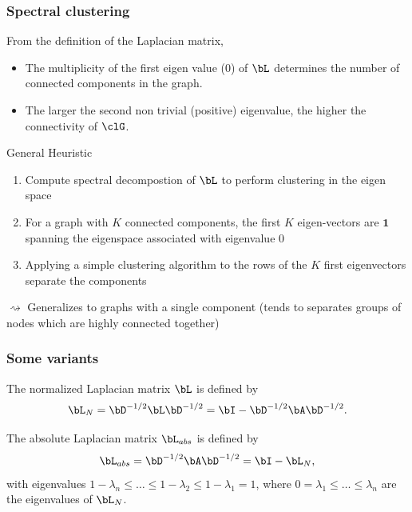 \documentclass{beamer}\usepackage[]{graphicx}\usepackage[]{color}
\begin{document}
\begin{frame}
  \frametitle{Spectral clustering}

From the definition of the Laplacian matrix,
\begin{itemize}
  \item The multiplicity of the first eigen value ($0$) of $\bL$ determines the number of connected components in the graph.
  \item The larger the second non trivial (positive) eigenvalue, the higher the connectivity of $\clG$.
\end{itemize}


\begin{block}{General Heuristic}
\begin{enumerate}
\item Compute spectral decompostion of $\bL$ to perform clustering in the eigen space
\item For a graph with $K$ connected components, the first $K$ eigen-vectors are $\mathbf{1}$ spanning the eigenspace associated with eigenvalue $0$
\item Applying a simple clustering algorithm to the rows of the $K$ first eigenvectors separate the components
\end{enumerate}
\end{block}

$\rightsquigarrow$ Generalizes to graphs with a single component (tends to separates groups of nodes which are highly connected together)

\end{frame}

\begin{frame}
  \frametitle{Some variants}

  \begin{definition}
    The normalized Laplacian matrix $\bL$ is defined by 
    \[
      \bL_N = \bD^{-1/2}\bL\bD^{-1/2} = \bI - \bD^{-1/2} \bA \bD^{-1/2}.
    \]
  \end{definition}
  
  \vfill

  \begin{definition}
    The absolute Laplacian matrix $\bL_{abs}$ is defined by 
    \[
      \bL_{abs} = \bD^{-1/2}\bA\bD^{-1/2} = \bI - \bL_N,
    \]
    with eigenvalues $1-\lambda_n \leq \dots \leq 1-\lambda_2 \leq 1-\lambda_1 = 1$, where $0=\lambda_1\leq \dots \leq \lambda_n$ are the eigenvalues of $\bL_N$.
  \end{definition}

\end{frame}
\end{document}
